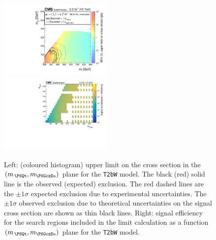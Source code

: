 \clearpage
\begin{figure}[!h]
  \begin{center}
    \includegraphics[width=0.49\textwidth]{RA1T2bW-X05XSEC_aux} \, 
    \includegraphics[width=0.49\textwidth]{T2bW_X05_merging_4_cats_aux} \,     
  \end{center}
  \caption{Left: (coloured histogram) upper limit on the cross section in the $(m_{\,\PSQt}, m_{\PSGczDo})$ plane for the \texttt{T2bW} model. 
  The black (red) solid line is the observed (expected) exclusion. The red dashed lines are the $\pm1\sigma$ expected exclusion due to experimental uncertainties. 
  The $\pm1\sigma$ observed exclusion due to theoretical uncertainties on the signal cross section are shown as thin black lines. 
  Right: signal efficiency for the search regions included in the limit calculation as a function $(m_{\,\PSQt}, m_{\PSGczDo})$ plane for the \texttt{T2bW} model. 
  \label{fig:T2bW_X05_excl}}
\end{figure}






